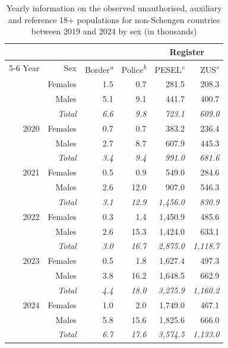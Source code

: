 \begin{table}[H]
\caption{\label{tbl-yearly-data}Yearly information on the observed unauthorised, auxiliary and reference 18+ populations for non-Schengen countries between 2019 and 2024 by sex (in thousands)} 
\fontsize{12.0pt}{14.0pt}\selectfont
\begin{tabular*}{\linewidth}{@{\extracolsep{\fill}}rrrrrr}
\toprule
 &  &  &  & \multicolumn{2}{c}{{Register}} \\ 
\cmidrule(lr){5-6}
Year & Sex & Border\textsuperscript{\textit{a}} & Police\textsuperscript{\textit{b}} & PESEL\textsuperscript{\textit{c}} & ZUS\textsuperscript{\textit{c}} \\ 
\midrule\addlinespace[2.5pt]
2019 & Females & 1.5 & 0.7 & 281.5 & 208.3 \\ 
 & Males & 5.1 & 9.1 & 441.7 & 400.7 \\ 
{\itshape } & {\itshape Total} & {\itshape 6.6} & {\itshape 9.8} & {\itshape 723.1} & {\itshape 609.0} \\ 
2020 & Females & 0.7 & 0.7 & 383.2 & 236.4 \\ 
 & Males & 2.7 & 8.7 & 607.9 & 445.3 \\ 
{\itshape } & {\itshape Total} & {\itshape 3.4} & {\itshape 9.4} & {\itshape 991.0} & {\itshape 681.6} \\ 
2021 & Females & 0.5 & 0.9 & 549.0 & 284.6 \\ 
 & Males & 2.6 & 12.0 & 907.0 & 546.3 \\ 
{\itshape } & {\itshape Total} & {\itshape 3.1} & {\itshape 12.9} & {\itshape 1,456.0} & {\itshape 830.9} \\ 
2022 & Females & 0.3 & 1.4 & 1,450.9 & 485.6 \\ 
 & Males & 2.6 & 15.3 & 1,424.0 & 633.1 \\ 
{\itshape } & {\itshape Total} & {\itshape 3.0} & {\itshape 16.7} & {\itshape 2,875.0} & {\itshape 1,118.7} \\ 
2023 & Females & 0.5 & 1.8 & 1,627.4 & 497.3 \\ 
 & Males & 3.8 & 16.2 & 1,648.5 & 662.9 \\ 
{\itshape } & {\itshape Total} & {\itshape 4.4} & {\itshape 18.0} & {\itshape 3,275.9} & {\itshape 1,160.2} \\ 
2024 & Females & 1.0 & 2.0 & 1,749.0 & 467.1 \\ 
 & Males & 5.8 & 15.6 & 1,825.6 & 666.0 \\ 
{\itshape } & {\itshape Total} & {\itshape 6.7} & {\itshape 17.6} & {\itshape 3,574.5} & {\itshape 1,133.0} \\ 

\end{tabular*}
\end{table}
